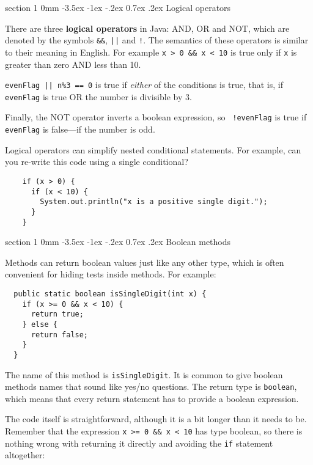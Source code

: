 \documentclass{book}
\makeatletter
\renewcommand{\section}{\@startsection 
    {section} {1} {0mm}%
    {-3.5ex \@plus -1ex \@minus -.2ex}%
    {0.7ex \@plus.2ex}%
    {\normalfont\Large\bfseries}}
\makeatother
\begin{document}
\section{Logical operators}

There are three {\bf logical operators} in Java: AND, OR and NOT,
which are denoted by the symbols {\tt \&\&}, {\tt ||} and
{\tt !}.  The semantics of these operators is similar
to their meaning in English.  For example {\tt x > 0 \&\& x < 10}
is true only if {\tt x} is greater than zero AND less than 10.


{\tt evenFlag || n\%3 == 0} is true if {\em either} of
the conditions is true, that is, if {\tt evenFlag} is true OR the
number is divisible by 3.

Finally, the NOT operator inverts a boolean expression, so {\tt
  !evenFlag} is true if {\tt evenFlag} is false---if the number is
odd.


Logical operators can simplify nested
conditional statements.  For example, can you re-write
this code using a single conditional?

\begin{verbatim}
    if (x > 0) {
      if (x < 10) {
        System.out.println("x is a positive single digit.");
      }
    }
\end{verbatim}


\section{Boolean methods}
\label{boolean}

Methods can return boolean values just like any other type,
which is often convenient for hiding tests inside
methods.  For example:

\begin{verbatim}
  public static boolean isSingleDigit(int x) {
    if (x >= 0 && x < 10) {
      return true;
    } else {
      return false;
    }
  }
\end{verbatim}
%
The name of this method is {\tt isSingleDigit}.  It is common
to give boolean methods names that sound like yes/no questions.
The return type is {\tt boolean}, which means that every return
statement has to provide a boolean expression.

The code itself is straightforward, although it is a bit longer than
it needs to be.  Remember that the expression {\tt x >= 0 \&\& x < 10}
has type boolean, so there is nothing wrong with returning it
directly and avoiding the {\tt if} statement altogether:
\end{document}
